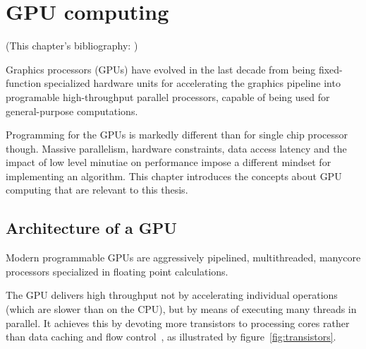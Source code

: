 \chapter{GPU computing}
\label{ch:gpu-computing}

(This chapter's bibliography:
\cite{cudaprog2} \cite{owens08} \cite{jansen07} \cite{lejdfors08}%
)

Graphics processors (GPUs) have evolved in the last decade
from being fixed-function specialized hardware units
for accelerating the graphics pipeline
into programable high-throughput parallel processors,
capable of being used for general-purpose computations.

Programming for the GPUs is markedly different
than for single chip processor though.
Massive parallelism,
hardware constraints,
data access latency and
the impact of low level minutiae on performance
impose a different mindset for implementing an algorithm.
This chapter introduces the concepts
about GPU computing that are relevant to this thesis.

\section{Architecture of a GPU}

Modern programmable GPUs are aggressively pipelined,
multithreaded, manycore processors
specialized in floating point calculations.

The GPU delivers high throughput not by accelerating individual operations
(which are slower than on the CPU),
but by means of executing many threads in parallel.
It achieves this by devoting more transistors to processing cores
rather than data caching and flow control~\cite[\S1]{cudaprog2},
as illustrated by figure~\ref{fig:transistors}.

